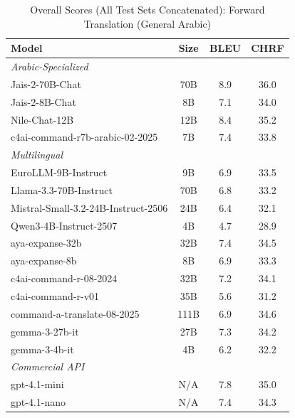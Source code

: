 \begin{table}[htbp]
\centering
\caption{Overall Scores (All Test Sets Concatenated): Forward Translation (General Arabic)}
\label{tab:overall_scores_forward_arabic_general}
\begin{tabular}{l@{\hspace{3pt}}c@{\hspace{3pt}}c@{\hspace{3pt}}c}
\toprule
Model & Size & BLEU & CHRF \\
\midrule
\multicolumn{4}{l}{\textit{Arabic-Specialized}} \\
\midrule
Jais-2-70B-Chat & 70B & 8.9 & 36.0 \\
Jais-2-8B-Chat & 8B & 7.1 & 34.0 \\
Nile-Chat-12B & 12B & 8.4 & 35.2 \\
c4ai-command-r7b-arabic-02-2025 & 7B & 7.4 & 33.8 \\
\midrule
\multicolumn{4}{l}{\textit{Multilingual}} \\
\midrule
EuroLLM-9B-Instruct & 9B & 6.9 & 33.5 \\
Llama-3.3-70B-Instruct & 70B & 6.8 & 33.2 \\
Mistral-Small-3.2-24B-Instruct-2506 & 24B & 6.4 & 32.1 \\
Qwen3-4B-Instruct-2507 & 4B & 4.7 & 28.9 \\
aya-expanse-32b & 32B & 7.4 & 34.5 \\
aya-expanse-8b & 8B & 6.9 & 33.3 \\
c4ai-command-r-08-2024 & 32B & 7.2 & 34.1 \\
c4ai-command-r-v01 & 35B & 5.6 & 31.2 \\
command-a-translate-08-2025 & 111B & 6.9 & 34.6 \\
gemma-3-27b-it & 27B & 7.3 & 34.2 \\
gemma-3-4b-it & 4B & 6.2 & 32.2 \\
\midrule
\multicolumn{4}{l}{\textit{Commercial API}} \\
\midrule
gpt-4.1-mini & N/A & 7.8 & 35.0 \\
gpt-4.1-nano & N/A & 7.4 & 34.3 \\
\midrule
\bottomrule
\end{tabular}
\end{table}